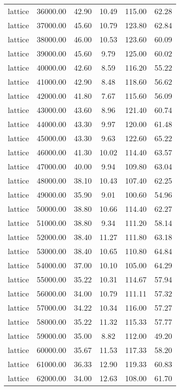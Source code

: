 \begin{table}[ht]
\begin{table}[ht]
\begin{tabular}{|cccccc}
  lattice & 36000.00 & 42.90 & 10.49 & 115.00 & 62.28 \\ 
  lattice & 37000.00 & 45.60 & 10.79 & 123.80 & 62.84 \\ 
  lattice & 38000.00 & 46.00 & 10.53 & 123.60 & 60.09 \\ 
  lattice & 39000.00 & 45.60 & 9.79 & 125.00 & 60.02 \\ 
  lattice & 40000.00 & 42.60 & 8.59 & 116.20 & 55.22 \\ 
  lattice & 41000.00 & 42.90 & 8.48 & 118.60 & 56.62 \\ 
  lattice & 42000.00 & 41.80 & 7.67 & 115.60 & 56.09 \\ 
  lattice & 43000.00 & 43.60 & 8.96 & 121.40 & 60.74 \\ 
  lattice & 44000.00 & 43.30 & 9.97 & 120.00 & 61.48 \\ 
  lattice & 45000.00 & 43.30 & 9.63 & 122.60 & 65.22 \\ 
  lattice & 46000.00 & 41.30 & 10.02 & 114.40 & 63.57 \\ 
  lattice & 47000.00 & 40.00 & 9.94 & 109.80 & 63.04 \\ 
  lattice & 48000.00 & 38.10 & 10.43 & 107.40 & 62.25 \\ 
  lattice & 49000.00 & 35.90 & 9.01 & 100.60 & 54.96 \\ 
  lattice & 50000.00 & 38.80 & 10.66 & 114.40 & 62.27 \\ 
  lattice & 51000.00 & 38.80 & 9.34 & 111.20 & 58.14 \\ 
  lattice & 52000.00 & 38.40 & 11.27 & 111.80 & 63.18 \\ 
  lattice & 53000.00 & 38.40 & 10.65 & 110.80 & 64.84 \\ 
  lattice & 54000.00 & 37.00 & 10.10 & 105.00 & 64.29 \\ 
  lattice & 55000.00 & 35.22 & 10.31 & 114.67 & 57.94 \\ 
  lattice & 56000.00 & 34.00 & 10.79 & 111.11 & 57.32 \\ 
  lattice & 57000.00 & 34.22 & 10.34 & 116.00 & 57.27 \\ 
  lattice & 58000.00 & 35.22 & 11.32 & 115.33 & 57.77 \\ 
  lattice & 59000.00 & 35.00 & 8.82 & 112.00 & 49.20 \\ 
  lattice & 60000.00 & 35.67 & 11.53 & 117.33 & 58.20 \\ 
  lattice & 61000.00 & 36.33 & 12.90 & 119.33 & 60.83 \\ 
  lattice & 62000.00 & 34.00 & 12.63 & 108.00 & 61.70 \\ 

\end{tabular}
\end{table}
\end{table}
